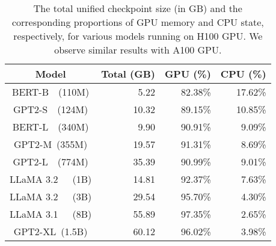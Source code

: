 \begin{table}[t]
\centering
\renewcommand{\arraystretch}{.9} %
\begin{tabular}{@{}c|rrr@{}}
\toprule
\textbf{Model} & \textbf{Total (GB)} & \textbf{GPU (\%)} & \textbf{CPU (\%)} \\ \midrule
BERT-B~~(110M)  & 5.22  & 82.38\%  & 17.62\% \\
GPT2-S~~(124M)  & 10.32 & 89.15\%  & 10.85\% \\
BERT-L~~(340M)  & 9.90  & 90.91\%  & 9.09\%   \\
GPT2-M~(355M)  & 19.57 & 91.31\% & 8.69\%   \\
GPT2-L~~(774M)  & 35.39 & 90.99\% & 9.01\%  \\
LLaMA 3.2~~~(1B) & 14.81 & 92.37\% & 7.63\%  \\
LLaMA 3.2~~~(3B) & 29.54 & 95.70\%  & 4.30\%   \\
LLaMA 3.1~~~(8B) & 55.89 & 97.35\% & 2.65\%  \\
GPT2-XL~(1.5B) & 60.12 & 96.02\% & 3.98\%  \\ \bottomrule
\end{tabular}
\vspace{-.5em}
\caption{The total unified checkpoint size (in GB) and the corresponding proportions of GPU memory and CPU state, respectively, for various models running on H100 GPU. We observe similar results with A100 GPU.}
\label{tab:cpu-to-gpu-state-comparison}
\vspace{-1.5em}
\end{table}